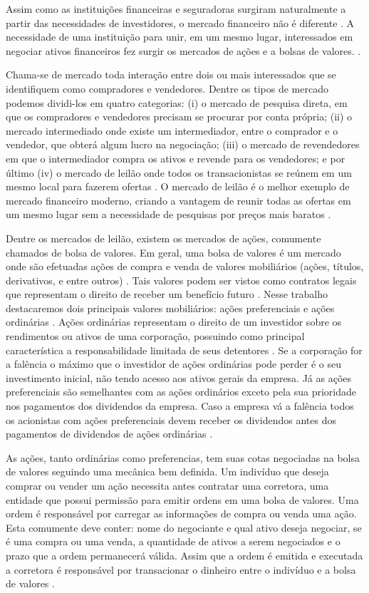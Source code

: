 Assim como as instituições financeiras e seguradoras surgiram naturalmente a partir das necessidades de investidores, o mercado financeiro não é diferente \cite{investments}. A necessidade de uma instituição para unir, em um mesmo lugar, interessados em negociar ativos financeiros fez surgir os mercados de ações e a bolsas de valores. \cite{investments}.

Chama-se de mercado toda interação entre dois ou mais interessados que se identifiquem como compradores e vendedores. Dentre os tipos de mercado podemos dividi-los em quatro categorias: (i) o mercado de pesquisa direta, em que os compradores e vendedores precisam se procurar por conta própria; (ii) o mercado intermediado onde existe um intermediador, entre o comprador e o vendedor, que obterá algum lucro na negociação; (iii) o mercado de revendedores em que o intermediador compra os ativos e revende para os vendedores; e por último (iv) o mercado de leilão onde todos os transacionistas se reúnem em um mesmo local para fazerem ofertas \cite{investments}. O mercado de leilão é o melhor exemplo de mercado financeiro moderno, criando a vantagem de reunir todas as ofertas em um mesmo lugar sem a necessidade de pesquisas por preços mais baratos \cite{investments}.

Dentre os mercados de leilão, existem os mercados de ações, comumente chamados de bolsa de valores. Em geral, uma bolsa de valores é um mercado onde são efetuadas ações de compra e venda de valores mobiliários (ações, títulos, derivativos, e entre outros) \cite{gomes1997bolsa}. Tais valores podem ser vistos como contratos legais que representam o direito de receber um benefício futuro \cite{elton2012moderna}. Nesse trabalho destacaremos dois principais valores mobiliários: ações preferenciais e ações ordinárias \cite{elton2012moderna}. Ações ordinárias representam o direito de um investidor sobre os rendimentos ou ativos de uma corporação, possuindo como principal característica a responsabilidade limitada de seus detentores \cite{investments}. Se a corporação for a falência o máximo que o investidor de ações ordinárias pode perder é o seu investimento inicial, não tendo acesso aos ativos gerais da empresa. Já as ações preferenciais são semelhantes com as ações ordinários exceto pela sua prioridade nos pagamentos dos dividendos da empresa. Caso a empresa vá a falência todos os acionistas com ações preferenciais devem receber os dividendos antes dos pagamentos de dividendos de ações ordinárias \cite{elton2012moderna}.

As ações, tanto ordinárias como preferencias, tem suas cotas negociadas na bolsa de valores seguindo uma mecânica bem definida. Um indivíduo que deseja comprar ou vender um ação necessita antes contratar uma corretora, uma entidade que possui permissão para emitir ordens em uma bolsa de valores. Uma ordem é responsável por carregar as informações de compra ou venda uma ação. Esta comumente deve conter: nome do negociante e qual ativo deseja negociar, se é uma compra ou uma venda, a quantidade de ativos a serem negociados e o prazo que a ordem permanecerá válida. Assim que a ordem é emitida e executada a corretora é responsável por transacionar o dinheiro entre o indivíduo e a bolsa de valores \cite{elton2012moderna}.

